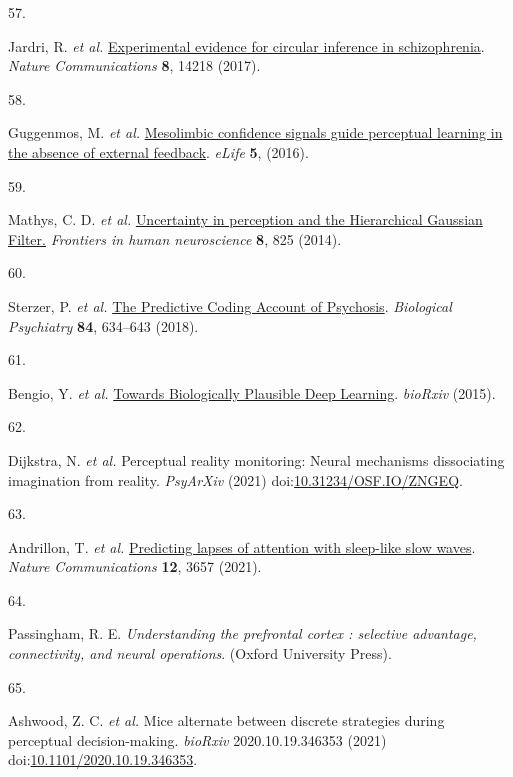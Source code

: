 \documentclass[
]{article}
\newlength{\cslhangindent}
\newlength{\csllabelwidth}
\newlength{\cslentryspacingunit} %
\newenvironment{CSLReferences}[2] %
 {%
  \setlength{\parindent}{0pt}
  \ifodd #1
  \let\oldpar\par
  \def\par{\hangindent=\cslhangindent\oldpar}
  \fi
  \setlength{\parskip}{#2\cslentryspacingunit}
 }%
 {}
\newcommand{\CSLLeftMargin}[1]{\parbox[t]{\csllabelwidth}{#1}}
\newcommand{\CSLRightInline}[1]{\parbox[t]{\linewidth - \csllabelwidth}{#1}\break}
\begin{document}
\begin{CSLReferences}{0}{0}
\leavevmode{}%
\CSLLeftMargin{57. }%
\CSLRightInline{Jardri, R. \emph{et al.}
\href{https://doi.org/10.1038/ncomms14218}{{Experimental evidence for
circular inference in schizophrenia}}. \emph{Nature Communications}
\textbf{8}, 14218 (2017).}

\leavevmode{}%
\CSLLeftMargin{58. }%
\CSLRightInline{Guggenmos, M. \emph{et al.}
\href{https://doi.org/10.7554/eLife.13388}{{Mesolimbic confidence
signals guide perceptual learning in the absence of external feedback}}.
\emph{eLife} \textbf{5}, (2016).}

\leavevmode{}%
\CSLLeftMargin{59. }%
\CSLRightInline{Mathys, C. D. \emph{et al.}
\href{https://doi.org/10.3389/fnhum.2014.00825}{{Uncertainty in
perception and the Hierarchical Gaussian Filter.}} \emph{Frontiers in
human neuroscience} \textbf{8}, 825 (2014).}

\leavevmode{}%
\CSLLeftMargin{60. }%
\CSLRightInline{Sterzer, P. \emph{et al.}
\href{https://doi.org/10.1016/j.biopsych.2018.05.015}{{The Predictive
Coding Account of Psychosis}}. \emph{Biological Psychiatry} \textbf{84},
634--643 (2018).}

\leavevmode{}%
\CSLLeftMargin{61. }%
\CSLRightInline{Bengio, Y. \emph{et al.}
\href{http://arxiv.org/abs/1502.04156}{{Towards Biologically Plausible
Deep Learning}}. \emph{bioRxiv} (2015).}

\leavevmode{}%
\CSLLeftMargin{62. }%
\CSLRightInline{Dijkstra, N. \emph{et al.} {Perceptual reality
monitoring: Neural mechanisms dissociating imagination from reality}.
\emph{PsyArXiv} (2021)
doi:\href{https://doi.org/10.31234/OSF.IO/ZNGEQ}{10.31234/OSF.IO/ZNGEQ}.}

\leavevmode{}%
\CSLLeftMargin{63. }%
\CSLRightInline{Andrillon, T. \emph{et al.}
\href{https://doi.org/10.1038/s41467-021-23890-7}{{Predicting lapses of
attention with sleep-like slow waves}}. \emph{Nature Communications}
\textbf{12}, 3657 (2021).}

\leavevmode{}%
\CSLLeftMargin{64. }%
\CSLRightInline{Passingham, R. E. \emph{{Understanding the prefrontal
cortex : selective advantage, connectivity, and neural operations}}.
(Oxford University Press).}

\leavevmode{}%
\CSLLeftMargin{65. }%
\CSLRightInline{Ashwood, Z. C. \emph{et al.} {Mice alternate between
discrete strategies during perceptual decision-making}. \emph{bioRxiv}
2020.10.19.346353 (2021)
doi:\href{https://doi.org/10.1101/2020.10.19.346353}{10.1101/2020.10.19.346353}.}


\end{CSLReferences}
\end{document}
